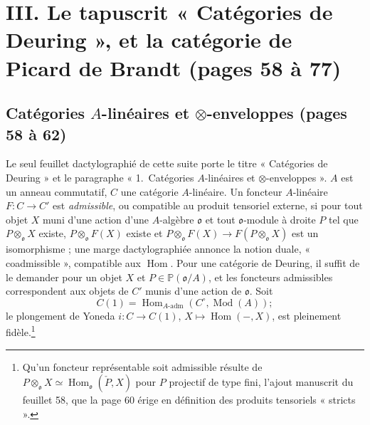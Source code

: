 \documentclass[11pt,a4paper]{article}
\begin{document}
\section*{III. Le tapuscrit « Catégories de Deuring », et la catégorie de Picard de Brandt (pages 58 à 77)}

\subsection*{Catégories $A$-linéaires et $\otimes$-enveloppes (pages 58 à 62)}

Le seul feuillet dactylographié de cette suite porte le titre « Catégories de
Deuring » et le paragraphe « 1.\ Catégories $A$-linéaires et
$\otimes$-enveloppes ». $A$ est un anneau commutatif, $C$ une catégorie
$A$-linéaire. Un foncteur $A$-linéaire $F \colon C \to C'$ est \emph{admissible},
ou compatible au produit tensoriel externe, si pour tout objet $X$ muni d'une
action d'une $A$-algèbre $\mathfrak{o}$ et tout $\mathfrak{o}$-module à droite
$P$ tel que $P \otimes_{\mathfrak{o}} X$ existe, $P \otimes_{\mathfrak{o}} F(X)$
existe et $P \otimes_{\mathfrak{o}} F(X) \to F(P \otimes_{\mathfrak{o}} X)$ est un
isomorphisme ; une marge dactylographiée annonce la notion duale,
« coadmissible », compatible aux $\operatorname{Hom}$. Pour une catégorie de
Deuring, il suffit de le demander pour un objet $X$ et $P \in
\mathbb{P}(\mathfrak{o}/A)$, et les foncteurs admissibles correspondent aux
objets de $C'$ munis d'une action de $\mathfrak{o}$. Soit
\[
  C(1) = \operatorname{Hom}_{A\text{-adm}}(C^{\circ}, \operatorname{Mod}(A)) ;
\]
le plongement de Yoneda $i \colon C \to C(1)$, $X \mapsto \operatorname{Hom}(-,
X)$, est pleinement fidèle.\footnote{Qu'un foncteur représentable soit
admissible résulte de $P \otimes_{\mathfrak{o}} X \simeq
\operatorname{Hom}_{\mathfrak{o}}(\check{P}, X)$ pour $P$ projectif de type fini,
l'ajout manuscrit du feuillet 58, que la page 60 érige en définition des
produits tensoriels « stricts ».}
\end{document}
